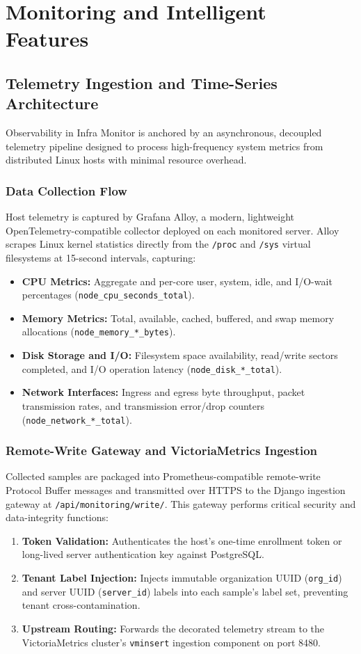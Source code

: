 \chapter{Monitoring and Intelligent Features}

\section{Telemetry Ingestion and Time-Series Architecture}
Observability in Infra Monitor is anchored by an asynchronous, decoupled telemetry pipeline designed to process high-frequency system metrics from distributed Linux hosts with minimal resource overhead.

\subsection{Data Collection Flow}
Host telemetry is captured by Grafana Alloy, a modern, lightweight OpenTelemetry-compatible collector deployed on each monitored server. Alloy scrapes Linux kernel statistics directly from the \texttt{/proc} and \texttt{/sys} virtual filesystems at 15-second intervals, capturing:
\begin{itemize}
  \item \textbf{CPU Metrics:} Aggregate and per-core user, system, idle, and I/O-wait percentages (\texttt{node\_cpu\_seconds\_total}).
  \item \textbf{Memory Metrics:} Total, available, cached, buffered, and swap memory allocations (\texttt{node\_memory\_*\_bytes}).
  \item \textbf{Disk Storage and I/O:} Filesystem space availability, read/write sectors completed, and I/O operation latency (\texttt{node\_disk\_*\_total}).
  \item \textbf{Network Interfaces:} Ingress and egress byte throughput, packet transmission rates, and transmission error/drop counters (\texttt{node\_network\_*\_total}).
\end{itemize}

\subsection{Remote-Write Gateway and VictoriaMetrics Ingestion}
Collected samples are packaged into Prometheus-compatible remote-write Protocol Buffer messages and transmitted over HTTPS to the Django ingestion gateway at \texttt{/api/monitoring/write/}. This gateway performs critical security and data-integrity functions:
\begin{enumerate}
  \item \textbf{Token Validation:} Authenticates the host's one-time enrollment token or long-lived server authentication key against PostgreSQL.
  \item \textbf{Tenant Label Injection:} Injects immutable organization UUID (\texttt{org\_id}) and server UUID (\texttt{server\_id}) labels into each sample's label set, preventing tenant cross-contamination.
  \item \textbf{Upstream Routing:} Forwards the decorated telemetry stream to the VictoriaMetrics cluster's \texttt{vminsert} ingestion component on port 8480.
\end{enumerate}

